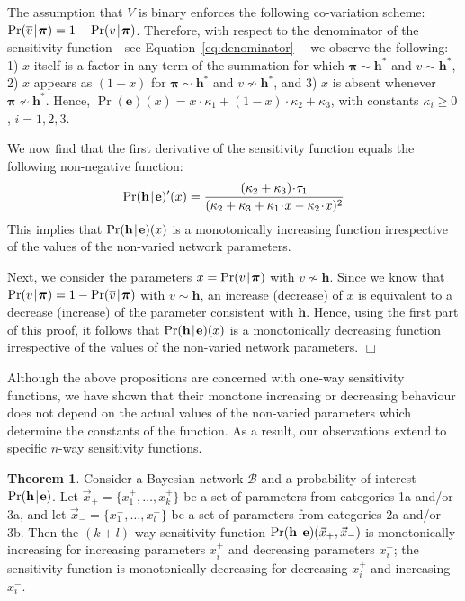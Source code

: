 \documentclass[10pt,a4paper]{paper}
\theoremstyle{definition}
\newtheorem{theorem}{Theorem}[section]
\newcommand{\bpi}{\boldsymbol\pi}
\newcommand{\ct}[1]{\tau_{#1}}
\newcommand{\cn}[1]{\kappa_{#1}}
\newcommand{\hyp}{\mathbf{h}}
\newcommand{\ev}{\mathbf{e}}
\newcommand{\cd}{\!\cdot\!}
\newcommand{\newmid}{\hspace{0.9pt}\vert\hspace{0.9pt}}
\begin{document}
The assumption that $V$ is binary enforces the following co-variation scheme:  $\Pr(\overline{v}\newmid{\bpi})=1-\Pr(v\newmid\bpi)$. Therefore, with respect to the denominator of the sensitivity function---see Equation~\eqref{eq:denominator}--- 
we observe the following: 1) $x$ itself is a factor in any term of the summation for which $\bpi\sim \hyp^*$ and $v\sim \hyp^*$, 2) $x$ appears as $(1-x)$ for $\bpi\sim \hyp^*$ and $v\nsim \hyp^*$, and 3) $x$ is absent whenever $\bpi\nsim\hyp^*$. Hence, $\Pr(\ev)(x) = x\cd\cn{1}+(1-x)\cd\cn{2}+\cn{3}$, with constants $\cn{i}\geq 0$, $i=1,2,3$. 

We now find that the first derivative of the sensitivity function equals 
the following non-negative function:
\[
\Pr(\hyp\newmid\ev)'(x)=\frac{(\cn{2}+\cn{3})\cd\ct{1}}{(\cn{2}+\cn{3}+\cn{1}\cd x-\cn{2}\cd x)^2}
\]
This implies that $\Pr(\hyp\newmid \ev)(x)$ is a monotonically increasing function irrespective of the values of the non-varied network parameters. 

Next, we consider the parameters $x= \Pr(v\newmid\bpi)$ with $v\nsim \hyp$. Since we know that $\Pr(v\newmid{\bpi})=1-\Pr(\overline{v}\newmid\bpi)$ with $\overline{v}\sim\hyp$, an increase (decrease) of $x$ is equivalent to a decrease (increase) of the parameter consistent with $\hyp$. 
Hence, using the first part of this proof, it follows that $\Pr(\hyp\newmid \ev)(x)$ is a monotonically decreasing function irrespective of the values of the non-varied network parameters. \hfill $\Box$

\bigskip

Although the above propositions are concerned with one-way sensitivity functions, we have shown that their monotone increasing or decreasing behaviour does not depend on the actual values of the non-varied parameters which determine the constants of the function. As a result, our observations extend to specific $n$-way sensitivity functions.

\begin{theorem}
Consider a Bayesian network ${\mathcal B}$ and a probability of interest $\Pr(\hyp\newmid\ev)$. 
Let ${\vec{x}}_+=\{x_1^+,\ldots ,x_k^+\}$ be a set of parameters from categories 1a and/or 3a, and let ${\vec{x}}_-=\{x_1^-,\ldots ,x_l^-\}$ be a set of parameters from categories 2a and/or 3b. Then the $(k+l)$-way sensitivity function $\Pr(\hyp\newmid\ev)({\vec{x}}_+,{\vec{x}}_-)$ is monotonically increasing for increasing parameters $x_i^+$ and decreasing parameters $x_i^-$; 
the sensitivity function is monotonically decreasing for decreasing $x_i^+$ and increasing $x_i^-$. 
\label{theo}
\end{theorem}
\end{document}
